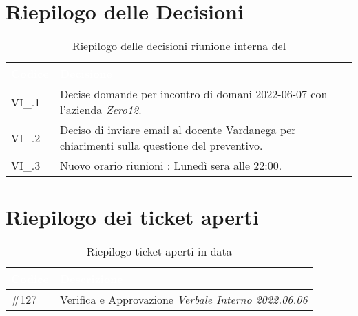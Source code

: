 \section{Riepilogo delle Decisioni}


\begin{table}[!htbp]
    \renewcommand{\arraystretch}{1.5}
    \begin{tabular}{m{}<{\centering}  m{}<{\centering}}
        \rowcolor{darkblue} \textcolor{white}{\textbf{Codice}} & \textcolor{white}{\textbf{Decisione}}                        \\
        \hline
        VI\_{}\D{}.1                                            & Decise domande per incontro di domani 2022-06-07 con l'azienda \textit{Zero12}. \\ 
        VI\_{}\D{}.2                                           & Deciso di inviare email al docente Vardanega per chiarimenti sulla questione del preventivo. \\
        VI\_{}\D{}.3                                            & Nuovo orario riunioni : Lunedì sera alle 22:00. \\ 
    \end{tabular}
    \caption{Riepilogo delle decisioni riunione interna del \D}
\end{table}

\section{Riepilogo dei ticket aperti}

\begin{table}[!htbp]
    \renewcommand{\arraystretch}{1.5}
    \begin{tabular}{m{}<{\centering}  m{}<{\centering}}
        \rowcolor{darkblue} \textcolor{white}{\textbf{Codice}} & \textcolor{white}{\textbf{Descrizione}}                        \\
        \hline
        \#{127}										  & Verifica e Approvazione \textit{Verbale Interno 2022.06.06} \\
    \end{tabular}
    \caption{Riepilogo ticket aperti in data \D}
\end{table}